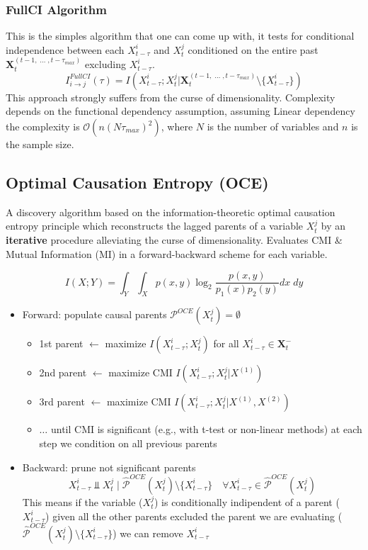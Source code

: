 \subsubsection{FullCI Algorithm}
This is the simples algorithm that one can come up with, it tests for conditional independence between each
$X^i_{t-\tau}$ and $X^j_t$ conditioned on the entire past $\bm{X}_t^{(t-1,\;\ldots\;, t-\tau_{max})}$ excluding $X^i_{t-\tau}$.
\begin{equation}
    I^{FullCI}_{i\rightarrow j}(\tau)=I(X^i_{t-\tau};X_t^j|\bm{X}_t^{(t-1,\;\ldots\;, t-\tau_{max})}\setminus\{X^i_{t-\tau}\})
\end{equation}
This approach strongly suffers from the curse of dimensionality.
Complexity depends on the functional dependency assumption, assuming Linear dependency the complexity is
$\mathcal{O}(n(N\tau_{max})^2)$, where $N$ is the number of variables and $n$ is the sample size.

\subsection{Optimal Causation Entropy (OCE)}
A discovery algorithm based on the information-theoretic optimal causation entropy principle which reconstructs 
the lagged parents of a variable $X_t^j$ by an \textbf{iterative} procedure alleviating the curse of dimensionality.
Evaluates CMI \& Mutual Information (MI) in a forward-backward scheme for each variable.

\begin{equation}
    I(X;Y)=\int_Y\int_X{p(x,y)\log_2{\frac{p(x, y)}{p_1(x)p_2(y)}}dx\;dy}
\end{equation}
\begin{itemize}
    \item Forward: populate causal parents $\mathcal{P}^{OCE}(X^j_t)=\emptyset$
        \begin{itemize}
            \item 1st parent $\leftarrow$ maximize $I(X^i_{t-\tau};X^j_{t})$ for all $X^i_{t-\tau}\in\bm{X}_t^-$
            \item 2nd parent $\leftarrow$ maximize CMI $I(X^i_{t-\tau};X^j_{t}|X^{(1)})$
            \item 3rd parent $\leftarrow$ maximize CMI $I(X^i_{t-\tau};X^j_{t}|X^{(1)},X^{(2)})$
            \item $\ldots$ until CMI is significant (e.g., with t-test or non-linear methods) at each step we condition on all previous parents
        \end{itemize}
    \item Backward: prune not significant parents
    \begin{equation*}
        X^i_{t-\tau}\Perp X^j_{t} \;|\; \hat{\mathcal{P}}^{OCE}(X^j_t)\setminus\{X^i_{t-\tau}\}\quad
        \forall X^i_{t-\tau}\in\hat{\mathcal{P}}^{OCE}(X^j_t)
    \end{equation*}
    This means if the variable ($X^j_{t}$) is conditionally indipendent of a parent ($X^i_{t-\tau}$) given all the other parents
    excluded the parent we are evaluating ($\hat{\mathcal{P}}^{OCE}(X^j_t)\setminus\{X^i_{t-\tau}\}$) we can remove $X^i_{t-\tau}$
\end{itemize}

